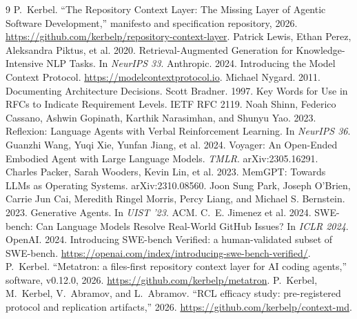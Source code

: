 \documentclass[sigconf,nonacm]{acmart}
\newcommand{\artifact}{\url{https://github.com/kerbelp/context-md}}
\begin{document}
\begingroup\small
\begin{thebibliography}{9}
 P.~Kerbel. ``The Repository Context Layer: The Missing Layer
of Agentic Software Development,'' manifesto and specification repository, 2026.
\url{https://github.com/kerbelp/repository-context-layer}.
 Patrick Lewis, Ethan Perez, Aleksandra Piktus, et al. 2020.
Retrieval-Augmented Generation for Knowledge-Intensive NLP Tasks. In \emph{NeurIPS
33}.
 Anthropic. 2024. Introducing the Model Context Protocol.
\url{https://modelcontextprotocol.io}.
 Michael Nygard. 2011. Documenting Architecture Decisions.
 Scott Bradner. 1997. Key Words for Use in RFCs to Indicate
Requirement Levels. IETF RFC 2119.
 Noah Shinn, Federico Cassano, Ashwin Gopinath,
Karthik Narasimhan, and Shunyu Yao. 2023. Reflexion: Language Agents with Verbal
Reinforcement Learning. In \emph{NeurIPS 36}.
 Guanzhi Wang, Yuqi Xie, Yunfan Jiang, et al. 2024.
Voyager: An Open-Ended Embodied Agent with Large Language Models. \emph{TMLR}.
arXiv:2305.16291.
 Charles Packer, Sarah Wooders, Kevin Lin, et al. 2023.
MemGPT: Towards LLMs as Operating Systems. arXiv:2310.08560.
 Joon Sung Park, Joseph O'Brien, Carrie Jun Cai,
Meredith Ringel Morris, Percy Liang, and Michael S. Bernstein. 2023. Generative
Agents. In \emph{UIST '23}. ACM.
 C.~E. Jimenez et al. 2024. SWE-bench: Can Language Models
Resolve Real-World GitHub Issues? In \emph{ICLR 2024}.
 OpenAI. 2024. Introducing SWE-bench Verified: a
human-validated subset of SWE-bench.
\url{https://openai.com/index/introducing-swe-bench-verified/}.
 P.~Kerbel. ``Metatron: a files-first repository context layer
for AI coding agents,'' software, v0.12.0, 2026.
\url{https://github.com/kerbelp/metatron}.
 P.~Kerbel, M.~Kerbel, V.~Abramov, and L.~Abramov. ``RCL
efficacy study: pre-registered protocol and replication artifacts,'' 2026.
\artifact.
\end{thebibliography}
\endgroup
\end{document}

